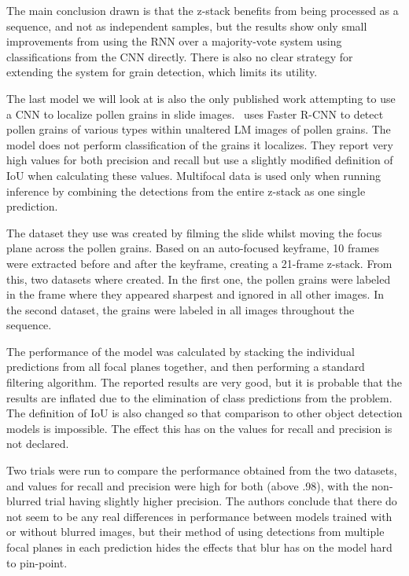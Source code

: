 The main conclusion drawn is that the z-stack benefits from being processed as a sequence, and not as independent samples, but the results show only small improvements from using the RNN over a majority-vote system using classifications from the CNN directly.
There is also no clear strategy for extending the system for grain detection, which limits its utility.

The last model we will look at is also the only published work attempting to use a CNN to localize pollen grains in slide images.\ \textcite{gallardo_caballero_precise_2019} uses Faster R-CNN to detect pollen grains of various types within unaltered LM images of pollen grains.
The model does not perform classification of the grains it localizes.
They report very high values for both precision and recall but use a slightly modified definition of IoU when calculating these values.
Multifocal data is used only when running inference by combining the detections from the entire z-stack as one single prediction.

The dataset they use was created by filming the slide whilst moving the focus plane across the pollen grains.
Based on an auto-focused keyframe, 10 frames were extracted before and after the keyframe, creating a 21-frame z-stack.
From this, two datasets where created.
In the first one, the pollen grains were labeled in the frame where they appeared sharpest and ignored in all other images.
In the second dataset, the grains were labeled in all images throughout the sequence.

The performance of the model was calculated by stacking the individual predictions from all focal planes together, and then performing a standard filtering algorithm.
The reported results are very good, but it is probable that the results are inflated due to the elimination of class predictions from the problem.
The definition of IoU is also changed so that comparison to other object detection models is impossible.
The effect this has on the values for recall and precision is not declared.

Two trials were run to compare the performance obtained from the two datasets, and values for recall and precision were high for both (above .98), with the non-blurred trial having slightly higher precision.
The authors conclude that there do not seem to be any real differences in performance between models trained with or without blurred images, but their method of using detections from multiple focal planes in each prediction hides the effects that blur has on the model hard to pin-point.


